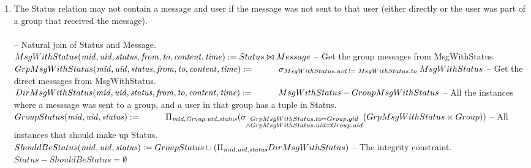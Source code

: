 \documentclass{article}
\newcommand{\var}[1]{\mathit{#1}}
\begin{document}
\begin{enumerate}
 
\item
The Status relation may not contain a message and user if the message was not sent to that user (either directly or the user was part of a group that received the message). \\\\ [5pt]
{\large
\hspace*{1cm} -- Natural join of Status and Message.\\ [5pt]
$
MsgWithStatus(\var{mid}, \var{uid}, \var{status}, \var{from}, \var{to}, \var{content}, \var{time}) := 
	Status \bowtie Message \\\\ [5pt]
$ 
\hspace*{1cm} -- Get the group messages from MsgWithStatus. \\ [5pt]
$
GrpMsgWithStatus(\var{mid}, \var{uid}, \var{status}, \var{from}, \var{to}, \var{content}, \var{time}) := \\ [5pt]
\hspace*{1cm}
	\sigma_{MsgWithStatus.uid \; != \; MsgWithStatus.to} \; MsgWithStatus \\\\ [5pt]
$
\hspace*{1cm} -- Get the direct messages from MsgWithStatus. \\ [5pt]
$
DirMsgWithStatus(\var{mid}, \var{uid}, \var{status}, \var{from}, \var{to}, \var{content}, \var{time}) := \\ [5pt]
\hspace*{1cm}
	MsgWithStatus - GroupMsgWithStatus \\\\ [5pt]
$
\hspace*{1cm} -- All the instances where a messsage was sent to a group, and a user in that \hspace*{1cm}group has a tuple in Status. \\ [5pt]
$
GroupStatus(\var{mid}, \var{uid}, \var{status}) := \\ [5pt]
	\hspace*{1cm}\Pi_{\var{mid}, \var{Group.uid}, \var{status}}
	(\sigma_{\substack{GrpMsgWithStatus.to = Group.gid \\
			\wedge GrpMsgWithStatus.uid = Group.uid}}
			(GrpMsgWithStatus \times Group)) \\\\\\ [5pt]
$
\hspace*{1cm} -- All instances that should make up Status. \\ [5pt]
$
ShouldBeStatus(\var{mid}, \var{uid}, \var{status}) :=
	GroupStatus \cup
	(\Pi_{\var{mid}, \var{uid}, \var{status}} DirMsgWithStatus) \\\\ [5pt]
$
\hspace*{1cm} -- The integrity constraint. \\ [5pt]
$
Status - ShouldBeStatus = \emptyset
$
}
\end{enumerate}
\end{document}
